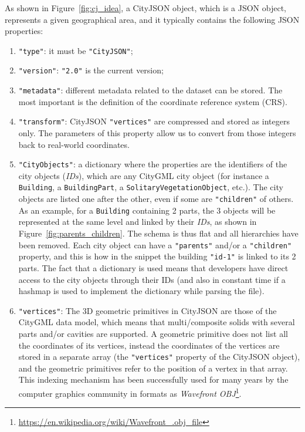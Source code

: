 \documentclass{isprs} %
\begin{document}
As shown in Figure~\ref{fig:cj_idea}, a CityJSON object, which is a JSON object, represents a given geographical area, and it typically contains the following JSON properties: 
\begin{enumerate}
  \item \texttt{"type"}: it must be \texttt{"CityJSON"};
  \item \texttt{"version"}: \texttt{"2.0"} is the current version;
  \item \texttt{"metadata"}: different metadata related to the dataset can be stored. The most important is the definition of the coordinate reference system (CRS).
  \item \texttt{"transform"}: CityJSON \texttt{"vertices"} are compressed and stored as integers only. The parameters of this property allow us to convert from those integers back to real-world coordinates.
  \item \texttt{"CityObjects"}: a dictionary where the properties are the identifiers of the city objects (\emph{IDs}), which are any CityGML city object (for instance a \texttt{Building}, a \texttt{BuildingPart}, a \texttt{SolitaryVegetationObject}, etc.).
  The city objects are listed one after the other, even if some are \texttt{"children"} of others.
  As an example, for a \texttt{Building} containing 2 parts, the 3 objects will be represented at the same level and linked by their \emph{IDs}, as shown in Figure~\ref{fig:parents_children}.
  The schema is thus flat and all hierarchies have been removed.
  Each city object can have a \texttt{"parents"} and/or a \texttt{"children"} property, and this is how in the snippet the building \texttt{"id-1"} is linked to its 2 parts.
  The fact that a dictionary is used means that developers have direct access to the city objects through their IDs (and also in constant time if a hashmap is used to implement the dictionary while parsing the file).
  \item \texttt{"vertices"}: The 3D geometric primitives in CityJSON are those of the CityGML data model, which means that multi/composite solids with several parts and/or cavities are supported.
  A geometric primitive does not list all the coordinates of its vertices, instead the coordinates of the vertices are stored in a separate array (the \texttt{"vertices"} property of the CityJSON object), and the geometric primitives refer to the position of a vertex in that array.
  This indexing mechanism has been successfully used for many years by the computer graphics community in formats as \emph{Wavefront OBJ}\footnote{\url{https://en.wikipedia.org/wiki/Wavefront_.obj_file}}.

\end{enumerate}
\end{document}
